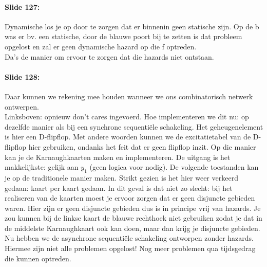 \documentclass[10pt,a4paper]{book}
\begin{document}
\paragraph{Slide 127:} Dynamische los je op door te zorgen dat er binnenin geen statische zijn. Op de b was er bv. een statische, door de blauwe poort bij te zetten is dat probleem opgelost en zal er geen dynamische hazard op die f optreden.\\
Da's de manier om ervoor te zorgen dat die hazards niet ontstaan.

\paragraph{Slide 128:} Daar kunnen we rekening mee houden wanneer we ons combinatorisch netwerk ontwerpen.\\
Linksboven: opnieuw don't cares ingevoerd. Hoe implementeren we dit nu: op dezelfde manier als bij een synchrone sequenti\"ele schakeling. Het geheugenelement is hier een D-flipflop. Met andere woorden kunnen we de excitatietabel van de D-flipflop hier gebruiken, ondanks het feit dat er geen flipflop inzit. Op die manier kan je de Karnaughkaarten maken en implementeren. De uitgang is het makkelijkste: gelijk aan $y_1$ (geen logica voor nodig). De volgende toestanden kan je op de traditionele manier maken. Strikt gezien is het hier weer verkeerd gedaan: kaart per kaart gedaan. In dit geval is dat niet zo slecht: bij het realiseren van de kaarten moest je ervoor zorgen dat er geen disjuncte gebieden waren. Hier zijn er geen disjuncte gebieden dus is in principe vrij van hazards. Je zou kunnen bij de linkse kaart de blauwe rechthoek niet gebruiken zodat je dat in de middelste Karnaughkaart ook kan doen, maar dan krijg je disjuncte gebieden. Nu hebben we de asynchrone sequenti\"ele schakeling ontworpen zonder hazards.\\
Hiermee zijn niet alle problemen opgelost! Nog meer problemen qua tijdsgedrag die kunnen optreden.
\end{document}
